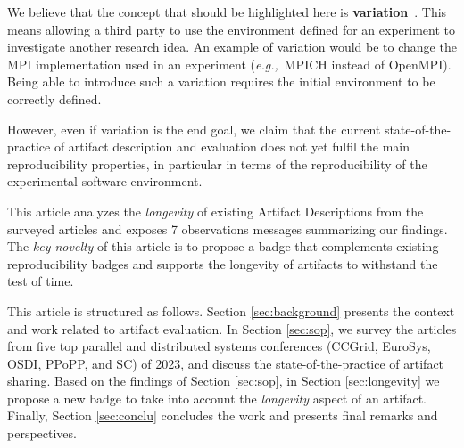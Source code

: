 \documentclass[sigconf,natbib=false]{acmart}
\newcommand{\eg}{\emph{e.g.,}}
\newcommand{\ad}{Artifact Description}
\begin{document}


We believe that the concept that should be highlighted here is \textbf{variation}\ \cite{mercier2018considering, feitelson_repeatability_2015}.
This means allowing a third party to use the environment defined for an experiment to investigate another research idea.
An example of variation would be to change the MPI implementation used in an experiment (\eg\ MPICH instead of OpenMPI).
Being able to introduce such a variation requires the initial environment to be correctly defined.

However, even if variation is the end goal, we claim that the current state-of-the-practice of artifact description and evaluation does not yet fulfil the main reproducibility properties, in particular in terms of the reproducibility of the experimental software environment.

This article analyzes the \emph{longevity} of existing \ad s from the surveyed articles and exposes 7 observations messages summarizing our findings.
The \textit{key novelty} of this article is to propose a badge that complements existing reproducibility badges and supports the longevity of artifacts to withstand the test of time. 

This article is structured as follows.
Section \ref{sec:background} presents the context and work related to artifact evaluation.
In Section \ref{sec:sop}, we survey the articles from five top parallel and distributed systems conferences (CCGrid, EuroSys, OSDI, PPoPP, and SC) of 2023, and discuss the state-of-the-practice of artifact sharing.
Based on the findings of Section \ref{sec:sop}, in Section \ref{sec:longevity} we propose a new badge to take into account the \emph{longevity} aspect of an artifact.
Finally, Section \ref{sec:conclu} concludes the work and presents final remarks and perspectives.
\end{document}
